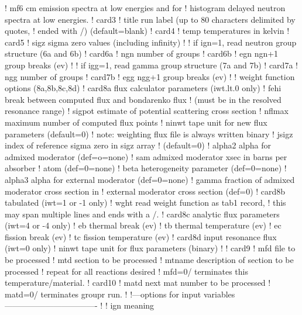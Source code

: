 \begin{ccode}
   !            mf6 cm emission spectra at low energies and for
   !            histogram delayed neutron spectra at low energies.
   ! card3
   !    title   run label (up to 80 characters delimited by quotes,
   !            ended with /)  (default=blank)
   ! card4
   !    temp    temperatures in kelvin
   ! card5
   !    sigz    sigma zero values (including infinity)
   !
   !          if ign=1, read neutron group structure (6a and 6b)
   ! card6a
   !    ngn     number of groups
   ! card6b
   !    egn     ngn+1 group breaks (ev)
   !
   !          if igg=1, read gamma group structure (7a and 7b)
   ! card7a
   !    ngg     number of groups
   ! card7b
   !    egg     ngg+1 group breaks (ev)
   !
   !          weight function options (8a,8b,8c,8d)
   ! card8a     flux calculator parameters (iwt.lt.0 only)
   !    fehi    break between computed flux and bondarenko flux
   !            (must be in the resolved resonance range)
   !    sigpot  estimate of potential scattering cross section
   !    nflmax  maximum number of computed flux points
   !    ninwt   tape unit for new flux parameters (default=0)
   !            note: weighting flux file is always written binary
   !    jsigz   index of reference sigma zero in sigz array
   !            (default=0)
   !    alpha2   alpha for admixed moderator (def=o=none)
   !    sam      admixed moderator xsec in barns per absorber
   !             atom (def=0=none)
   !    beta     heterogeneity parameter (def=0=none)
   !    alpha3   alpha for external moderator (def=0=none)
   !    gamma    fraction of admixed moderator cross section in
   !              external moderator cross section (def=0)
   ! card8b     tabulated (iwt=1 or -1 only)
   !    wght    read weight function as tab1 record,
   !            this may span multiple lines and ends with a /.
   ! card8c     analytic flux parameters (iwt=4 or -4 only)
   !    eb      thermal break (ev)
   !    tb      thermal temperature (ev)
   !    ec      fission break (ev)
   !    tc      fission temperature (ev)
   ! card8d     input resonance flux (iwt=0 only)
   !    ninwt   tape unit for flux parameters (binary)
   !
   ! card9
   !    mfd     file to be processed
   !    mtd     section to be processed
   !    mtname  description of section to be processed
   !          repeat for all reactions desired
   !          mfd=0/ terminates this temperature/material.
   ! card10
   !    matd    next mat number to be processed
   !            matd=0/ terminates groupr run.
   !
   !---options for input variables----------------------------------
   !
   !     ign          meaning

\end{ccode}
